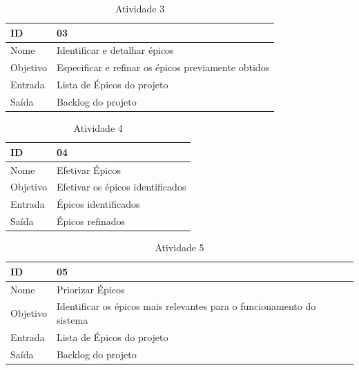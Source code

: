 \begin{table}[h]
	\centering
	\caption{Atividade 3}
	\label{my-label}
	\begin{tabular}{|l|l|}
		\hline
		ID       & 03                                                  \\ \hline
		Nome     & Identificar e detalhar épicos                       \\ \hline
		Objetivo & Especificar e refinar os épicos previamente obtidos \\ \hline
		Entrada  & Lista de Épicos do projeto                          \\ \hline
		Saída    & Backlog do projeto                                  \\ \hline
	\end{tabular}
\end{table}

\begin{table}[h]
	\centering
	\caption{Atividade 4}
	\label{my-label}
	\begin{tabular}{|l|l|}
		\hline
		ID       & 04                               \\ \hline
		Nome     & Efetivar Épicos                  \\ \hline
		Objetivo & Efetivar os épicos identificados \\ \hline
		Entrada  & Épicos identificados             \\ \hline
		Saída    & Épicos refinados                 \\ \hline
	\end{tabular}
\end{table}

\begin{table}[h]
	\centering
	\caption{Atividade 5}
	\label{my-label}
	\begin{tabular}{|l|l|}
		\hline
		ID       & 05                                                                    \\ \hline
		Nome     & Priorizar Épicos                                                      \\ \hline
		Objetivo & Identificar os épicos mais relevantes para o funcionamento do sistema \\ \hline
		Entrada  & Lista de Épicos do projeto                                            \\ \hline
		Saída    & Backlog do projeto                                                    \\ \hline
	\end{tabular}
\end{table}

